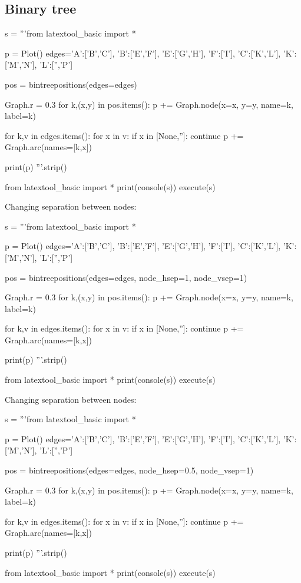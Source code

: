 \subsection{Binary tree}

\begin{python}
s = '''from latextool_basic import *

p = Plot()
edges={'A':['B','C'],
       'B':['E','F'],
       'E':['G','H'],
       'F':['I'],
       'C':['K','L'],
       'K':['M','N'],
       'L':['','P']}
     
pos = bintreepositions(edges=edges)

Graph.r = 0.3
for k,(x,y) in pos.items():
    p += Graph.node(x=x, y=y, name=k, label=k)

for k,v in edges.items():
    for x in v:
        if x in [None,'']: continue
        p += Graph.arc(names=[k,x])

print(p)
'''.strip()

from latextool_basic import *
print(console(s))
execute(s)
\end{python}





\newpage
Changing separation between nodes:
\begin{python}
s = '''from latextool_basic import *

p = Plot()
edges={'A':['B','C'],
       'B':['E','F'],
       'E':['G','H'],
       'F':['I'],
       'C':['K','L'],
       'K':['M','N'],
       'L':['','P']}
     
pos = bintreepositions(edges=edges, node_hsep=1, node_vsep=1)

Graph.r = 0.3
for k,(x,y) in pos.items():
    p += Graph.node(x=x, y=y, name=k, label=k)

for k,v in edges.items():
    for x in v:
        if x in [None,'']: continue
        p += Graph.arc(names=[k,x])

print(p)
'''.strip()

from latextool_basic import *
print(console(s))
execute(s)
\end{python}




\newpage
Changing separation between nodes:
\begin{python}
s = '''from latextool_basic import *

p = Plot()
edges={'A':['B','C'],
       'B':['E','F'],
       'E':['G','H'],
       'F':['I'],
       'C':['K','L'],
       'K':['M','N'],
       'L':['','P']}
     
pos = bintreepositions(edges=edges, node_hsep=0.5, node_vsep=1)

Graph.r = 0.3
for k,(x,y) in pos.items():
    p += Graph.node(x=x, y=y, name=k, label=k)

for k,v in edges.items():
    for x in v:
        if x in [None,'']: continue
        p += Graph.arc(names=[k,x])

print(p)
'''.strip()

from latextool_basic import *
print(console(s))
execute(s)
\end{python}



